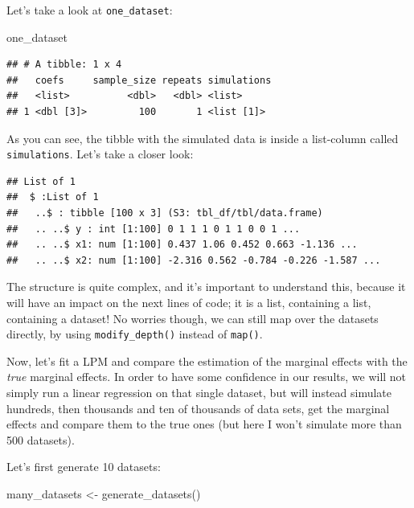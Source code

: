 \documentclass[
]{article}
\newenvironment{Shaded}{\begin{snugshade}}{\end{snugshade}}
\newcommand{\FunctionTok}[1]{\textcolor[rgb]{0.00,0.00,0.00}{#1}}
\newcommand{\NormalTok}[1]{#1}
\newcommand{\OtherTok}[1]{\textcolor[rgb]{0.56,0.35,0.01}{#1}}
\newcommand{\SpecialCharTok}[1]{\textcolor[rgb]{0.00,0.00,0.00}{#1}}
\begin{document}
Let's take a look at \texttt{one\_dataset}:

\begin{Shaded}
\begin{Highlighting}[]
\NormalTok{one\_dataset}
\end{Highlighting}
\end{Shaded}

\begin{verbatim}
## # A tibble: 1 x 4
##   coefs     sample_size repeats simulations
##   <list>          <dbl>   <dbl> <list>     
## 1 <dbl [3]>         100       1 <list [1]>
\end{verbatim}

As you can see, the tibble with the simulated data is inside a list-column called \texttt{simulations}.
Let's take a closer look:

\begin{Shaded}
\end{Shaded}

\begin{verbatim}
## List of 1
##  $ :List of 1
##   ..$ : tibble [100 x 3] (S3: tbl_df/tbl/data.frame)
##   .. ..$ y : int [1:100] 0 1 1 1 0 1 1 0 0 1 ...
##   .. ..$ x1: num [1:100] 0.437 1.06 0.452 0.663 -1.136 ...
##   .. ..$ x2: num [1:100] -2.316 0.562 -0.784 -0.226 -1.587 ...
\end{verbatim}

The structure is quite complex, and it's important to understand this, because it will have an
impact on the next lines of code; it is a list, containing a list, containing a dataset! No worries
though, we can still map over the datasets directly, by using \texttt{modify\_depth()} instead of \texttt{map()}.

Now, let's fit a LPM and compare the estimation of the marginal effects with the \emph{true} marginal
effects. In order to have some confidence in our results,
we will not simply run a linear regression on that single dataset, but will instead simulate hundreds,
then thousands and ten of thousands of data sets, get the marginal effects and compare
them to the true ones (but here I won't simulate more than 500 datasets).

Let's first generate 10 datasets:

\begin{Shaded}
\begin{Highlighting}[]
\NormalTok{many\_datasets }\OtherTok{\textless{}{-}} \FunctionTok{generate\_datasets}\NormalTok{()}
\end{Highlighting}
\end{Shaded}
\end{document}
